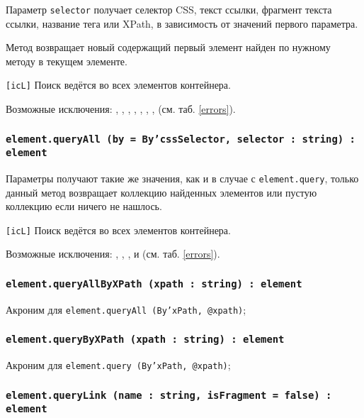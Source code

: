 Параметр \texttt{selector} получает селектор CSS, текст ссылки, фрагмент текста ссылки, название тега или XPath, в зависимость от значений первого параметра.

Метод возвращает новый \element{} содержащий первый элемент найден по нужному методу в текущем элементе.

\texttt{[icL]} Поиск ведётся во всех элементов контейнера.

Возможные исключения: , , , , , , ,  (см. таб. \ref{errors}).

\subsubsection{\texttt{element.queryAll (by = By'cssSelector, selector : string) : element}}

Параметры получают такие же значения, как и в случае с \texttt{element.query}, только данный метод возвращает коллекцию найденных элементов или пустую коллекцию если ничего не нашлось.

\texttt{[icL]} Поиск ведётся во всех элементов контейнера.

Возможные исключения: , , ,  и  (см. таб. \ref{errors}).

\subsubsection{\texttt{element.queryAllByXPath (xpath : string) : element}}

Акроним для \texttt{element.queryAll (By'xPath, @xpath)};

\subsubsection{\texttt{element.queryByXPath (xpath : string) : element}}

Акроним для \texttt{element.query (By'xPath, @xpath)};

\subsubsection{\texttt{element.queryLink (name : string, isFragment = false) : element}}

